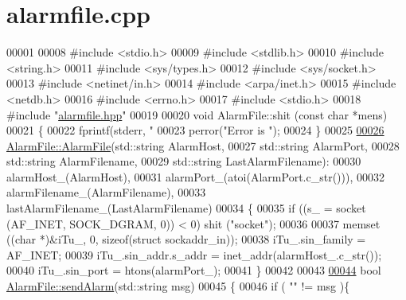 \hypertarget{alarmfile_8cpp_source}{}\section{alarmfile.\+cpp}
\label{alarmfile_8cpp_source}

\begin{DoxyCode}
00001 
00008 \textcolor{preprocessor}{#include <stdio.h>}
00009 \textcolor{preprocessor}{#include <stdlib.h>}
00010 \textcolor{preprocessor}{#include <string.h>}
00011 \textcolor{preprocessor}{#include <sys/types.h>}
00012 \textcolor{preprocessor}{#include <sys/socket.h>}
00013 \textcolor{preprocessor}{#include <netinet/in.h>}
00014 \textcolor{preprocessor}{#include <arpa/inet.h>}
00015 \textcolor{preprocessor}{#include <netdb.h>}
00016 \textcolor{preprocessor}{#include <errno.h>}
00017 \textcolor{preprocessor}{#include <stdio.h>}
00018 \textcolor{preprocessor}{#include "\hyperlink{alarmfile_8hpp}{alarmfile.hpp}"}
00019 
00020 \textcolor{keywordtype}{void} AlarmFile::shit (\textcolor{keyword}{const} \textcolor{keywordtype}{char} *mens)
00021 \{
00022   fprintf(stderr, \textcolor{stringliteral}{"%
00023   perror(\textcolor{stringliteral}{"Error is "});
00024 \}
00025 
\hyperlink{classAlarmFile_ab5b7a78583764cd70d8b5b93a243439d}{00026} \hyperlink{classAlarmFile_ab5b7a78583764cd70d8b5b93a243439d}{AlarmFile::AlarmFile}(std::string AlarmHost,
00027                      std::string AlarmPort,
00028                      std::string AlarmFilename,
00029                      std::string LastAlarmFilename):
00030   alarmHost\_(AlarmHost),
00031   alarmPort\_(atoi(AlarmPort.c\_str())),
00032   alarmFilename\_(AlarmFilename),
00033   lastAlarmFilename\_(LastAlarmFilename)
00034 \{
00035   \textcolor{keywordflow}{if} ((s\_ = socket (AF\_INET, SOCK\_DGRAM, 0)) < 0) shit (\textcolor{stringliteral}{"socket"});
00036 
00037   memset ((\textcolor{keywordtype}{char} *)&iTu\_, 0, \textcolor{keyword}{sizeof}(\textcolor{keyword}{struct} sockaddr\_in));
00038   iTu\_.sin\_family      = AF\_INET;  
00039   iTu\_.sin\_addr.s\_addr = inet\_addr(alarmHost\_.c\_str()); 
00040   iTu\_.sin\_port        = htons(alarmPort\_);
00041 \}
00042 
00043 
\hyperlink{classAlarmFile_a37fd701cca3c3458a3009b508383947b}{00044} \textcolor{keywordtype}{bool} \hyperlink{classAlarmFile_a37fd701cca3c3458a3009b508383947b}{AlarmFile::sendAlarm}(std::string msg)
00045 \{
00046   \textcolor{keywordflow}{if} ( \textcolor{stringliteral}{""} != msg )\{
}
\end{DoxyCode}
